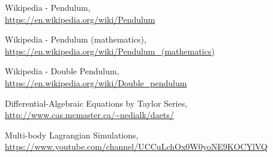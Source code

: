 \documentclass{article}
\begin{document}
\newpage
\begin{thebibliography}{9}
Wikipedia - Pendulum, \\\url{https://en.wikipedia.org/wiki/Pendulum}

Wikipedia - Pendulum (mathematics), 
\\\url{https://en.wikipedia.org/wiki/Pendulum_(mathematics)}

Wikipedia - Double Pendulum, 
\\\url{https://en.wikipedia.org/wiki/Double_pendulum}

Differential-Algebraic Equations by Taylor Series, 
\\\url{http://www.cas.mcmaster.ca/~nedialk/daets/}

Multi-body Lagrangian Simulations, 
\\\url{https://www.youtube.com/channel/UCCuLchOx0W0yoNE9KOCYlVQ}

\end{thebibliography}
\end{document}
